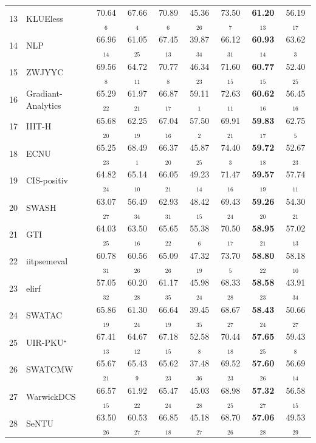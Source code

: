 \documentclass[11pt]{article}
\begin{document}
\begin{table}[t!]
\begin{small}
\begin{tabular}{c|l|cc|ccc|cc}
	13 & KLUEless & 70.64$_{6}$ & 67.66$_{4}$ & 70.89$_{6}$ & 45.36$_{26}$ & 73.50$_{7}$ & \bf 61.20$_{13}$ & 56.19$_{17}$\\
	14 & NLP & 66.96$_{14}$ & 61.05$_{25}$ & 67.45$_{13}$ & 39.87$_{34}$ & 66.12$_{31}$ & \bf 60.93$_{14}$ & 63.62$_{3}$\\
	15 & ZWJYYC & 69.56$_{8}$ & 64.72$_{11}$ & 70.77$_{8}$ & 46.34$_{23}$ & 71.60$_{15}$ & \bf 60.77$_{15}$ & 52.40$_{25}$\\
	16 & Gradiant-Analytics & 65.29$_{22}$ & 61.97$_{21}$ & 66.87$_{17}$ & 59.11$_{1}$ & 72.63$_{11}$ & \bf 60.62$_{16}$ & 56.45$_{16}$\\
	17 & IIIT-H & 65.68$_{20}$ & 62.25$_{19}$ & 67.04$_{16}$ & 57.50$_{2}$ & 69.91$_{21}$ & \bf 59.83$_{17}$ & 62.75$_{5}$\\
	18 & ECNU & 65.25$_{23}$ & 68.49$_{1}$ & 66.37$_{20}$ & 45.87$_{25}$ & 74.40$_{3}$ & \bf 59.72$_{18}$ & 52.67$_{23}$\\
	19 & CIS-positiv & 64.82$_{24}$ & 65.14$_{10}$ & 66.05$_{21}$ & 49.23$_{14}$ & 71.47$_{16}$ & \bf 59.57$_{19}$ & 57.74$_{11}$\\
	20 & SWASH & 63.07$_{27}$ & 56.49$_{34}$ & 62.93$_{31}$ & 48.42$_{15}$ & 69.43$_{24}$ & \bf 59.26$_{20}$ & 54.30$_{21}$\\
	21 & GTI & 64.03$_{25}$ & 63.50$_{16}$ & 65.65$_{22}$ & 55.38$_{6}$ & 70.50$_{17}$ & \bf 58.95$_{21}$ & 57.02$_{13}$\\
	22 & iitpsemeval & 60.78$_{31}$ & 60.56$_{26}$ & 65.09$_{26}$ & 47.32$_{19}$ & 73.70$_{5}$ & \bf 58.80$_{22}$ & 58.18$_{10}$\\
	23 & elirf & 57.05$_{32}$ & 60.20$_{28}$ & 61.17$_{35}$ & 45.98$_{24}$ & 68.33$_{28}$ & \bf 58.58$_{23}$ & 43.91$_{34}$\\
	24 & SWATAC & 65.86$_{19}$ & 61.30$_{24}$ & 66.64$_{19}$ & 39.45$_{35}$ & 68.67$_{27}$ & \bf 58.43$_{24}$ & 50.66$_{27}$\\
	25 & UIR-PKU$^\star$ & 67.41$_{13}$ & 64.67$_{12}$ & 67.18$_{15}$ & 52.58$_{8}$ & 70.44$_{18}$ & \bf 57.65$_{25}$ & 59.43$_{8}$\\
	26 & SWATCMW & 65.67$_{21}$ & 65.43$_{9}$ & 65.62$_{23}$ & 37.48$_{36}$ & 69.52$_{23}$ & \bf 57.60$_{26}$ & 56.69$_{14}$\\
	27 & WarwickDCS & 66.57$_{15}$ & 61.92$_{22}$ & 65.47$_{24}$ & 45.03$_{28}$ & 68.98$_{25}$ & \bf 57.32$_{27}$ & 56.58$_{15}$\\
	28 & SeNTU & 63.50$_{26}$ & 60.53$_{27}$ & 66.85$_{18}$ & 45.18$_{27}$ & 68.70$_{26}$ & \bf 57.06$_{28}$ & 49.53$_{29}$\\

\end{tabular}
\end{small}
\end{table}
\end{document}
